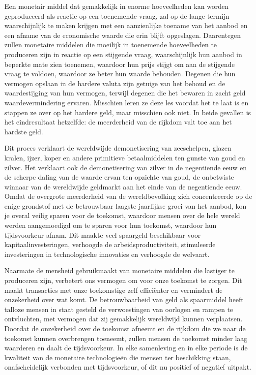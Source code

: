 \documentclass[
  a5paper,
  smalldemyvopaper,11pt,twoside,onecolumn,openright,extrafontsizes,
hidelinks]{memoir}
\begin{document}
Een monetair middel dat gemakkelijk in enorme hoeveelheden kan worden
geproduceerd als reactie op een toenemende vraag, zal op de lange
termijn waarschijnlijk te maken krijgen met een aanzienlijke toename van
het aanbod en een afname van de economische waarde die erin blijft
opgeslagen. Daarentegen zullen monetaire middelen die moeilijk in
toenemende hoeveelheden te produceren zijn in reactie op een stijgende
vraag, waarschijnlijk hun aanbod in beperkte mate zien toenemen,
waardoor hun prijs stijgt om aan de stijgende vraag te voldoen, waardoor
ze beter hun waarde behouden. Degenen die hun vermogen opslaan in de
hardere valuta zijn getuige van het behoud en de waardestijging van hun
vermogen, terwijl degenen die het bewaren in zacht geld
waardevermindering ervaren. Misschien leren ze deze les voordat het te
laat is en stappen ze over op het hardere geld, maar misschien ook niet.
In beide gevallen is het eindresultaat hetzelfde: de meerderheid van de
rijkdom valt toe aan het hardste geld.

Dit proces verklaart de wereldwijde demonetisering van zeeschelpen,
glazen kralen, ijzer, koper en andere primitieve betaalmiddelen ten
gunste van goud en zilver. Het verklaart ook de demonetisering van
zilver in de negentiende eeuw en de scherpe daling van de waarde ervan
ten opzichte van goud, de onbetwiste winnaar van de wereldwijde
geldmarkt aan het einde van de negentiende eeuw. Omdat de overgrote
meerderheid van de wereldbevolking zich concentreerde op de enige
grondstof met de betrouwbaar laagste jaarlijkse groei van het aanbod,
kon je overal veilig sparen voor de toekomst, waardoor mensen over de
hele wereld werden aangemoedigd om te sparen voor hun toekomst, waardoor
hun tijdsvoorkeur afnam. Dit maakte veel spaargeld beschikbaar voor
kapitaalinvesteringen, verhoogde de arbeidsproductiviteit, stimuleerde
investeringen in technologische innovaties en verhoogde de welvaart.

Naarmate de mensheid gebruikmaakt van monetaire middelen die lastiger te
produceren zijn, verbetert ons vermogen om voor onze toekomst te zorgen.
Dit maakt transacties met onze toekomstige zelf efficiënter en
vermindert de onzekerheid over wat komt. De betrouwbaarheid van geld als
spaarmiddel heeft talloze mensen in staat gesteld de verwoestingen van
oorlogen en rampen te ontvluchten, met vermogen dat zij gemakkelijk
wereldwijd kunnen verplaatsen. Doordat de onzekerheid over de toekomst
afneemt en de rijkdom die we naar de toekomst kunnen overbrengen
toeneemt, zullen mensen de toekomst minder laag waarderen en daalt de
tijdsvoorkeur. In elke samenleving en in elke periode is de kwaliteit
van de monetaire technologieën die mensen ter beschikking staan,
onafscheidelijk verbonden met tijdsvoorkeur, of dit nu positief of
negatief uitpakt.
\end{document}
